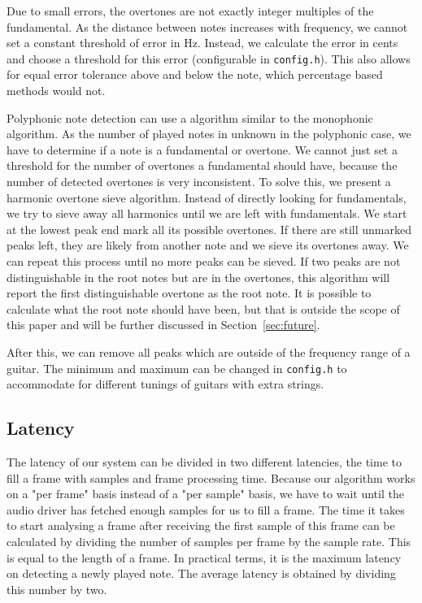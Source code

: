\documentclass[10pt,twocolumn]{article}
\begin{document}
Due to small errors, the overtones are not exactly integer multiples of the fundamental. As the distance between notes increases with frequency, we cannot set a constant threshold of error in Hz. Instead, we calculate the error in cents and choose a threshold for this error (configurable in \texttt{config.h}). This also allows for equal error tolerance above and below the note, which percentage based methods would not.

Polyphonic note detection can use a algorithm similar to the monophonic algorithm. As the number of played notes in unknown in the polyphonic case, we have to determine if a note is a fundamental or overtone. We cannot just set a threshold for the number of overtones a fundamental should have, because the number of detected overtones is very inconsistent. To solve this, we present a harmonic overtone sieve algorithm. Instead of directly looking for fundamentals, we try to sieve away all harmonics until we are left with fundamentals. We start at the lowest peak end mark all its possible overtones. If there are still unmarked peaks left, they are likely from another note and we sieve its overtones away. We can repeat this process until no more peaks can be sieved. If two peaks are not distinguishable in the root notes but are in the overtones, this algorithm will report the first distinguishable overtone as the root note. It is possible to calculate what the root note should have been, but that is outside the scope of this paper and will be further discussed in Section~\ref{sec:future}.

After this, we can remove all peaks which are outside of the frequency range of a guitar. The minimum and maximum can be changed in \texttt{config.h} to accommodate for different tunings of guitars with extra strings.

\subsection{Latency}
The latency of our system can be divided in two different latencies, the time to fill a frame with samples and frame processing time. Because our algorithm works on a "per frame" basis instead of a "per sample" basis, we have to wait until the audio driver has fetched enough samples for us to fill a frame. The time it takes to start analysing a frame after receiving the first sample of this frame can be calculated by dividing the number of samples per frame by the sample rate. This is equal to the length of a frame. In practical terms, it is the maximum latency on detecting a newly played note. The average latency is obtained by dividing this number by two.
\end{document}

